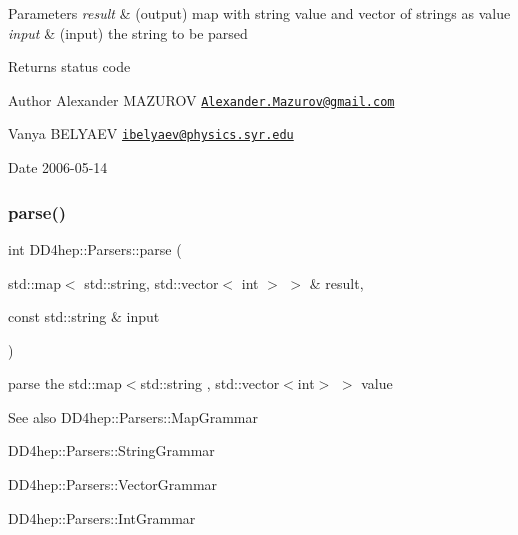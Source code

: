\begin{DoxyParams}{Parameters}
{\em result} & (output) map with string value and vector of strings as value \\
\hline
{\em input} & (input) the string to be parsed \\
\hline
\end{DoxyParams}
\begin{DoxyReturn}{Returns}
status code
\end{DoxyReturn}
\begin{DoxyAuthor}{Author}
Alexander M\+A\+Z\+U\+R\+OV \href{mailto:Alexander.Mazurov@gmail.com}{\tt Alexander.\+Mazurov@gmail.\+com} 

Vanya B\+E\+L\+Y\+A\+EV \href{mailto:ibelyaev@physics.syr.edu}{\tt ibelyaev@physics.\+syr.\+edu} 
\end{DoxyAuthor}
\begin{DoxyDate}{Date}
2006-\/05-\/14 
\end{DoxyDate}
\hypertarget{namespace_d_d4hep_1_1_parsers_a0da3b1bf74df4603de3860725652b1f7}{}\label{namespace_d_d4hep_1_1_parsers_a0da3b1bf74df4603de3860725652b1f7} 
\subsubsection{\texorpdfstring{parse()}{parse()}\hspace{0.1cm}{\footnotesize\ttfamily [12/21]}}
{\footnotesize\ttfamily int D\+D4hep\+::\+Parsers\+::parse (\begin{DoxyParamCaption}\item[{std\+::map$<$ std\+::string, std\+::vector$<$ int $>$ $>$ \&}]{result,  }\item[{const std\+::string \&}]{input }\end{DoxyParamCaption})}



parse the {\ttfamily std\+::map$<$std\+::string , std\+::vector$<$int$>$ $>$} value 

\begin{DoxySeeAlso}{See also}
D\+D4hep\+::\+Parsers\+::\+Map\+Grammar 

D\+D4hep\+::\+Parsers\+::\+String\+Grammar 

D\+D4hep\+::\+Parsers\+::\+Vector\+Grammar 

D\+D4hep\+::\+Parsers\+::\+Int\+Grammar 
\end{DoxySeeAlso}

